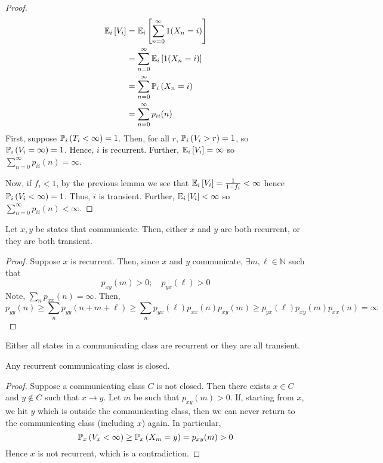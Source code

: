 \begin{proof}
    \begin{align*}
        \mathbb{E}_{i}\left[{V_i}\right] &= \mathbb{E}_{i}\left[{\sum_{n=0}^\infty 1(X_n = i)}\right] \\
        &= \sum_{n=0}^\infty \mathbb{E}_{i}\left[{1(X_n = i)}\right] \\
        &= \sum_{n=0}^\infty \mathbb{P}_{i}\left({X_n = i}\right) \\
        &= \sum_{n=0}^\infty p_{ii}(n)
    \end{align*}
    First, suppose \( \mathbb{P}_{i}\left({T_i < \infty}\right) = 1 \).
    Then, for all \( r \), \( \mathbb{P}_{i}\left({V_i > r}\right) = 1 \), so \( \mathbb{P}_{i}\left({V_i = \infty}\right) = 1 \).
    Hence, \( i \) is recurrent.
    Further, \( \mathbb{E}_{i}\left[{V_i}\right] = \infty \) so \( \sum_{n=0}^\infty p_{ii}(n) = \infty \).

    Now, if \( f_i < 1 \), by the previous lemma we see that \( \mathbb{E}_{i}\left[{V_i}\right] = \frac{1}{1-f_i} < \infty \) hence \( \mathbb{P}_{i}\left({V_i < \infty}\right) = 1 \).
    Thus, \( i \) is transient.
    Further, \( \mathbb{E}_{i}\left[{V_i}\right] < \infty \) so \( \sum_{n=0}^\infty p_{ii}(n) < \infty \).
\end{proof}
\begin{theorem}
    Let \( x, y \) be states that communicate.
    Then, either \( x \) and \( y \) are both recurrent, or they are both transient.
\end{theorem}
\begin{proof}
    Suppose \( x \) is recurrent.
    Then, since \( x \) and \( y \) communicate, \( \exists m, \ell \in \mathbb N \) such that
    \[ p_{xy}(m) > 0;\quad p_{yx}(\ell) > 0 \]
    Note, \( \sum_n p_{xx}(n) = \infty \).
    Then,
    \[ p_{yy}(n) \geq \sum_n p_{yy}(n+m+\ell) \geq \sum_n p_{yx}(\ell) p_{xx}(n) p_{xy}(m) \geq p_{yx}(\ell) p_{xy}(m) p_{xx}(n) = \infty \]
\end{proof}
\begin{corollary}
    Either all states in a communicating class are recurrent or they are all transient.
\end{corollary}
\begin{theorem}
    Any recurrent communicating class is closed.
\end{theorem}
\begin{proof}
    Suppose a communicating class \( C \) is not closed.
    Then there exists \( x \in C \) and \( y \not\in C \) such that \( x \to y \).
    Let \( m \) be such that \( p_{xy}(m) > 0 \).
    If, starting from \( x \), we hit \( y \) which is outside the communicating class, then we can never return to the communicating class (including \( x \)) again.
    In particular,
    \[ \mathbb{P}_{x}\left({V_x < \infty}\right) \geq \mathbb{P}_{x}\left({X_m = y}\right) = p_{xy}(m) > 0 \]
    Hence \( x \) is not recurrent, which is a contradiction.
\end{proof}
